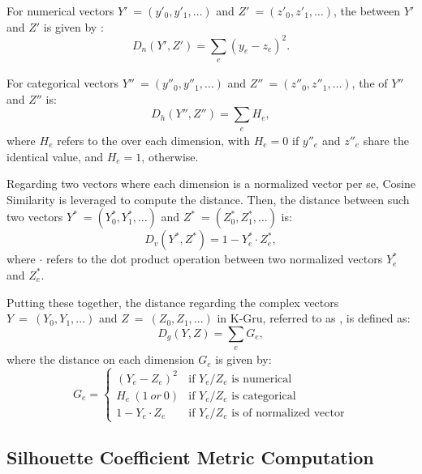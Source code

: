 For numerical vectors $Y'\ = (y'_0, y'_1, \ldots)$ and $Z'\ = (z'_0, z'_1, \ldots)$, the \od{} \cite{IEEEexample:books/mk/HanKP2011} between $Y'$ and $Z'$ is given by :
%
\begin{equation}
\label{eq:od}
D_n(Y', Z') = \sum_{\substack{e}} (y_e - z_e)^2.
\end{equation}

For categorical vectors $Y''\ = (y''_0, y''_1, \ldots)$ and  $Z''\ = (z''_0, z''_1, \ldots)$, the \hd{} \cite{IEEEexample:huang1997clustering} of $Y''$ and $Z''$ is:
%
\begin{equation}
\label{eq:hd}
D_h(Y'', Z'') = \sum_{\substack{e}} H_e,
\end{equation}
where $H_e$ refers to the \hd{} over each dimension, with $H_e = 0$ if $y''_e$ and $z''_e$ share the identical value, and $H_e = 1$, otherwise.

Regarding two vectors where each dimension is a normalized vector per se, Cosine Similarity is leveraged to compute the distance.
Then, the distance between such two vectors $Y^{\ast}\ = (Y^{\ast}_0, Y^{\ast}_1, ...)$ and $Z^{\ast}\ = (Z^{\ast}_0, Z^{\ast}_1, ...)$ is:
%
\begin{equation}
\label{eq:vd}
D_v(Y^{\ast}, Z^{\ast}) = 1- Y^{\ast}_e \cdot Z^{\ast}_e,
\end{equation}
where $\cdot$ refers to the dot product operation between two normalized vectors $Y^{\ast}_e$ and $Z^{\ast}_e$.

Putting these together, the distance regarding the complex vectors $Y\ =\ (Y_0, Y_1, ...)$ and $Z\ =\ (Z_0, Z_1, ...)$ in K-Gru, referred to as \gd{}, is defined as:
%
\begin{equation}
\label{eq:gd}
D_g(Y, Z) = \sum_{\substack{e}} G_e,
\end{equation}
where the distance on each dimension $G_e$ is given by:
%
\begin{equation}
\label{eq:ge}
G_e =
  \begin{cases}
    (Y_e - Z_e)^2       &  \text{if } Y_e/Z_e \text{ is numerical}\\
    H_e\ (1\ or\ 0)       	&  \text{if } Y_e/Z_e \text{ is categorical}\\
    1 - Y_e \cdot Z_e  		&  \text{if } Y_e/Z_e \text{ is of normalized vector}
  \end{cases}
\end{equation}


\subsection{Silhouette Coefficient Metric Computation}
\label{sec:compu}

